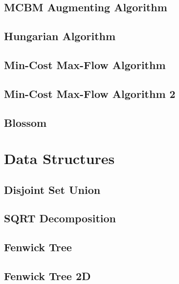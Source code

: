 \subsection{MCBM Augmenting Algorithm}
\raggedbottom
\hrulefill
\subsection{Hungarian Algorithm}
\raggedbottom
\hrulefill
\subsection{Min-Cost Max-Flow Algorithm}
\raggedbottom
\hrulefill
\subsection{Min-Cost Max-Flow Algorithm 2}
\raggedbottom
\hrulefill
\subsection{Blossom}
\raggedbottom
\hrulefill

\section{Data Structures}
\subsection{Disjoint Set Union}
\raggedbottom
\hrulefill
\subsection{SQRT Decomposition}
\raggedbottom
\hrulefill
\subsection{Fenwick Tree}
\raggedbottom
\hrulefill
\subsection{Fenwick Tree 2D}
\raggedbottom
\hrulefill
